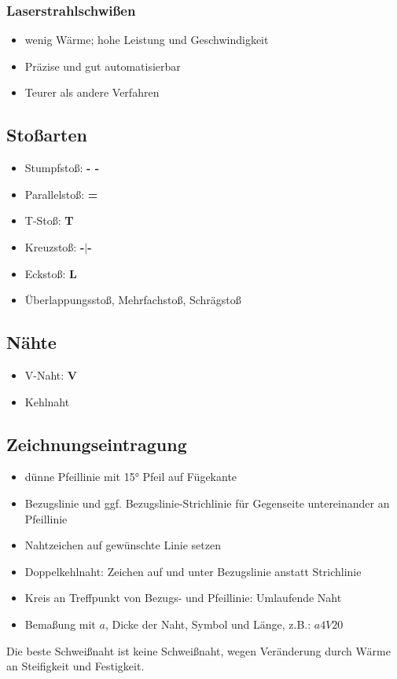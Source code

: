 \documentclass[a4paper,parskip=half*,DIV=7,fontsize=11pt]{scrartcl}
\begin{document}
\subsubsection{Laserstrahlschwißen}
\begin{itemize}
	\item wenig Wärme; hohe Leistung und Geschwindigkeit
	\item Präzise und gut automatisierbar
	\item Teurer als andere Verfahren
\end{itemize}

\subsection{Stoßarten}
\begin{itemize}
	\item Stumpfstoß: \textbf{- -}
	\item Parallelstoß: \textbf{=}
	\item T-Stoß: \textbf{T}
	\item Kreuzstoß: \textbf{-$\mid$-}
	\item Eckstoß: \textbf{L}
	\item Überlappungsstoß, Mehrfachstoß, Schrägstoß
\end{itemize}
	
\subsection{Nähte}
\begin{itemize}
	\item V-Naht: \textbf{V}
	\item Kehlnaht
\end{itemize}
	
\subsection{Zeichnungseintragung}
\begin{itemize}
	\item dünne Pfeillinie mit 15° Pfeil auf Fügekante
	\item Bezugslinie und ggf. Bezugslinie-Strichlinie für Gegenseite untereinander an Pfeillinie
	\item Nahtzeichen auf gewünschte Linie setzen
	\item Doppelkehlnaht: Zeichen auf und unter Bezugslinie anstatt Strichlinie
	\item Kreis an Treffpunkt von Bezugs- und Pfeillinie: Umlaufende Naht
	\item Bemaßung mit $a$, Dicke der Naht, Symbol und Länge, z.B.: $a4V20$
\end{itemize}
Die beste Schweißnaht ist keine Schweißnaht, wegen Veränderung durch Wärme an Steifigkeit und Festigkeit.
\end{document}
